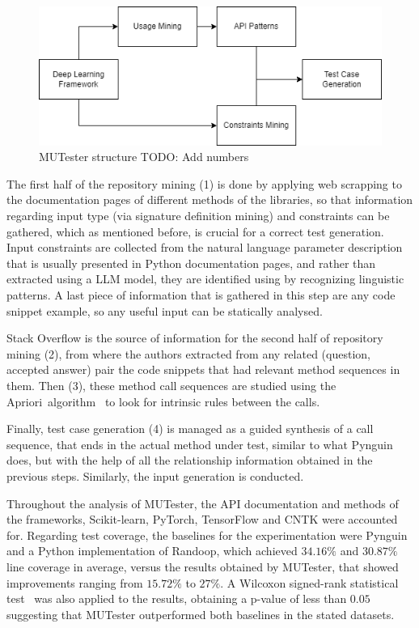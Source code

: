 \documentclass[%
  chapterprefix=false,%
  open=right,%
  twoside=true,%
  paper=a4,%
  logofile={Figures/logo.png},%
  thesistype=master,%
  UKenglish,%
]{se2thesis}
\begin{document}
\begin{figure}[tb]
  \centering 
  \includegraphics[width=.99\textwidth]{Figures/mutester.png}
  \caption{MUTester structure TODO: Add numbers}\label{fig:mutester}
\end{figure}

The first half of the repository mining (1) is done by applying web scrapping to the documentation pages of different methods of the libraries, so that information regarding input type (via signature definition mining) and constraints can be gathered, which as mentioned before, is crucial for a correct test generation.
Input constraints are collected from the natural language parameter description that is usually presented in Python documentation pages, and rather than extracted using a LLM model, they are identified using by recognizing linguistic patterns.
A last piece of information that is gathered in this step are any code snippet example, so any useful input can be statically analysed.

Stack Overflow is the source of information for the second half of repository mining (2), from where the authors extracted from any related (question, accepted answer) pair the code snippets that had relevant method sequences in them.
Then (3), these method call sequences are studied using the Apriori~algorithm~\cite{agrawal1994fast} to look for intrinsic rules between the calls.

Finally, test case generation (4) is managed as a guided synthesis of a call sequence, that ends in the actual method under test, similar to what Pynguin does, but with the help of all the relationship information obtained in the previous steps.
Similarly, the input generation is conducted.

Throughout the analysis of MUTester, the API documentation and methods of the frameworks,  Scikit-learn, PyTorch, TensorFlow and CNTK were accounted for.
Regarding test coverage, the baselines for the experimentation were Pynguin and a Python implementation of Randoop, which achieved \(34.16\%\) and \(30.87\%\) line coverage in average, versus the results obtained by MUTester, that showed improvements ranging from \(15.72\%\) to \(27\%\).
A Wilcoxon signed-rank
statistical test~\cite{Rey2011} was also applied to the results, obtaining a p-value of less than \(0.05\) suggesting that MUTester outperformed both baselines in the stated datasets.
\end{document}
